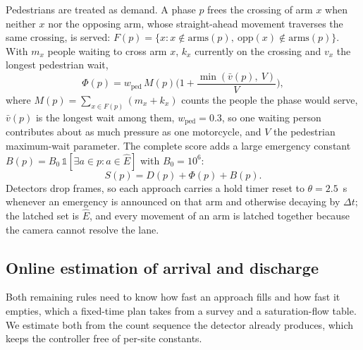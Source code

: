 \documentclass[journal]{IEEEtran}
\begin{document}
Pedestrians are treated as demand. A phase $p$ frees the crossing of arm $x$ when neither $x$ nor the opposing
arm, whose straight-ahead movement traverses the same crossing, is served:
$F(p) = \{x : x \notin \mathrm{arms}(p),\ \mathrm{opp}(x) \notin \mathrm{arms}(p)\}$. With $m_x$ people waiting
to cross arm $x$, $k_x$ currently on the crossing and $v_x$ the longest pedestrian wait,
\begin{equation}
\Phi(p) = w_{\mathrm{ped}} \, M(p) \Big( 1 + \frac{\min(\bar{v}(p),\ V)}{V} \Big),
\label{eq:pedpressure}
\end{equation}
where $M(p) = \sum_{x \in F(p)} (m_x + k_x)$ counts the people the phase would serve, $\bar{v}(p)$ is the longest wait among them, $w_{\mathrm{ped}} = 0.3$, so one waiting person contributes about as much pressure as one motorcycle, and
$V$ the pedestrian maximum-wait parameter. The complete score adds a large emergency constant
$B(p) = B_0 \, \mathbb{1}[\exists a \in p : a \in \hat{E}]$ with $B_0 = 10^6$:
\begin{equation}
S(p) = D(p) + \Phi(p) + B(p).
\label{eq:score}
\end{equation}
Detectors drop frames, so each approach carries a hold timer reset to $\theta = 2.5$~s whenever an emergency
is announced on that arm and otherwise decaying by $\Delta t$; the latched set is $\hat{E}$, and every
movement of an arm is latched together because the camera cannot resolve the lane.

\subsection{Online estimation of arrival and discharge}
\label{sec:estimation}

Both remaining rules need to know how fast an approach fills and how fast it empties, which a fixed-time plan
takes from a survey and a saturation-flow table. We estimate both from the count sequence the detector
already produces, which keeps the controller free of per-site constants.
\end{document}
